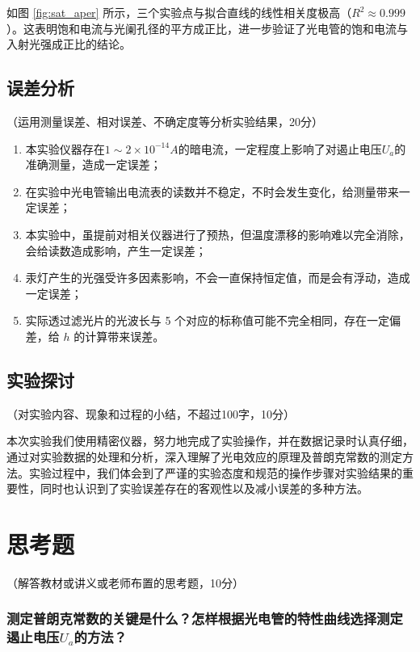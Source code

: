 \documentclass[10pt,a4paper]{ctexart}
\newcommand{\myspace}[1]{\par\vspace{#1\baselineskip}} %
\newcommand{\xiaosi}{\fontsize{12pt}{16pt}\selectfont}
\begin{document}
如图 \ref{fig:sat_aper} 所示，三个实验点与拟合直线的线性相关度极高（$R^2 \approx 0.999$）。这表明饱和电流与光阑孔径的平方成正比，进一步验证了光电管的饱和电流与入射光强成正比的结论。


    \subsection{误差分析}
    \xiaosi （运用测量误差、相对误差、不确定度等分析实验结果，20分）
    
    \begin{enumerate}
        \item 本实验仪器存在\(1 \sim  2×10^{-14}A\)的暗电流，一定程度上影响了对遏止电压\(U_a\)的准确测量，造成一定误差；
        \item 在实验中光电管输出电流表的读数并不稳定，不时会发生变化，给测量带来一定误差；
        \item 本实验中，虽提前对相关仪器进行了预热，但温度漂移的影响难以完全消除，会给读数造成影响，产生一定误差；
        \item 汞灯产生的光强受许多因素影响，不会一直保持恒定值，而是会有浮动，造成一定误差；
        \item 实际透过滤光片的光波长与 5 个对应的标称值可能不完全相同，存在一定偏差，给 $h$ 的计算带来误差。
    \end{enumerate}   
    
    \subsection{实验探讨}
    \xiaosi （对实验内容、现象和过程的小结，不超过100字，10分）

    \myspace{1}

    本次实验我们使用精密仪器，努力地完成了实验操作，并在数据记录时认真仔细，通过对实验数据的处理和分析，深入理解了光电效应的原理及普朗克常数的测定方法。实验过程中，我们体会到了严谨的实验态度和规范的操作步骤对实验结果的重要性，同时也认识到了实验误差存在的客观性以及减小误差的多种方法。
    \section{思考题}

    \xiaosi （解答教材或讲义或老师布置的思考题，10分）

    \subsubsection*{测定普朗克常数的关键是什么？怎样根据光电管的特性曲线选择测定遏止电压\(U_a\)的方法？}
\end{document}
